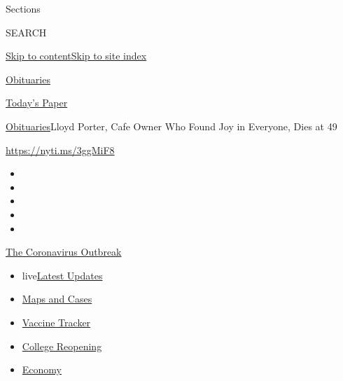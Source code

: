 Sections

SEARCH

\protect\hyperlink{site-content}{Skip to
content}\protect\hyperlink{site-index}{Skip to site index}

\href{https://www.nytimes3xbfgragh.onion/section/obituaries}{Obituaries}

\href{https://myaccount.nytimes3xbfgragh.onion/auth/login?response_type=cookie\&client_id=vi}{}

\href{https://www.nytimes3xbfgragh.onion/section/todayspaper}{Today's
Paper}

\href{/section/obituaries}{Obituaries}\textbar{}Lloyd Porter, Cafe Owner
Who Found Joy in Everyone, Dies at 49

\url{https://nyti.ms/3ggMiF8}

\begin{itemize}
\item
\item
\item
\item
\item
\end{itemize}

\href{https://www.nytimes3xbfgragh.onion/news-event/coronavirus?action=click\&pgtype=Article\&state=default\&region=TOP_BANNER\&context=storylines_menu}{The
Coronavirus Outbreak}

\begin{itemize}
\tightlist
\item
  live\href{https://www.nytimes3xbfgragh.onion/2020/08/04/world/coronavirus-covid-19.html?action=click\&pgtype=Article\&state=default\&region=TOP_BANNER\&context=storylines_menu}{Latest
  Updates}
\item
  \href{https://www.nytimes3xbfgragh.onion/interactive/2020/us/coronavirus-us-cases.html?action=click\&pgtype=Article\&state=default\&region=TOP_BANNER\&context=storylines_menu}{Maps
  and Cases}
\item
  \href{https://www.nytimes3xbfgragh.onion/interactive/2020/science/coronavirus-vaccine-tracker.html?action=click\&pgtype=Article\&state=default\&region=TOP_BANNER\&context=storylines_menu}{Vaccine
  Tracker}
\item
  \href{https://www.nytimes3xbfgragh.onion/2020/08/02/us/covid-college-reopening.html?action=click\&pgtype=Article\&state=default\&region=TOP_BANNER\&context=storylines_menu}{College
  Reopening}
\item
  \href{https://www.nytimes3xbfgragh.onion/live/2020/08/03/business/stock-market-today-coronavirus?action=click\&pgtype=Article\&state=default\&region=TOP_BANNER\&context=storylines_menu}{Economy}
\end{itemize}

